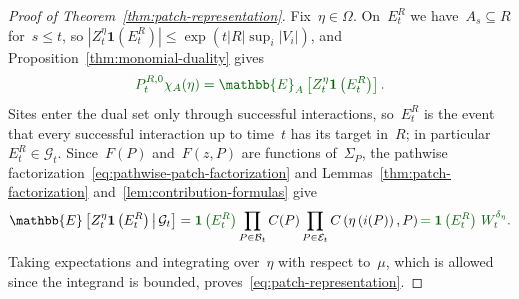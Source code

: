 \documentclass[EJP,preprint,NODS,nobera]{ejpecp}
\newcommand{\E}{\mathbb{E}}
\newcommand{\CE}[2]{\E\Cb{#1\,\middle|\,#2}}
\newcommand{\bb}[1]{\left(#1\right)}
\newcommand{\Cb}[1]{\left[#1\right]}
\newcommand{\abs}[1]{\left|#1\right|}
\newcommand{\ind}{\mathbf{1}}
\newcommand{\chg}[1]{{\color{changegreen}#1}}
\begin{document}
\begin{proof}[Proof of Theorem~\ref{thm:patch-representation}]
\chg{Fix~$\eta\in\Omega$. On~$E_t^R$ we have~$A_s\subseteq R$ for~$s\leq t$, so
$\abs{Z_t^\eta\ind(E_t^R)}\leq\exp\bb{t\abs R\sup_i\abs{V_i}}$, and
Proposition~\ref{thm:monomial-duality} gives}
\begin{equation*}
\chg{P_t^{R,0}\chi_A(\eta)=\E_A\Cb{Z_t^\eta\ind\bb{E_t^R}}.}
\end{equation*}
\chg{Sites enter the dual set only through successful interactions, so~$E_t^R$
is the event that every successful interaction up to time~$t$ has its target
in~$R$; in particular~$E_t^R\in\mathcal G_t$. Since~$F(P)$ and~$F(z,P)$ are
functions of~$\Sigma_P$, the pathwise factorization~\eqref{eq:pathwise-patch-factorization}
and Lemmas~\ref{thm:patch-factorization} and~\ref{lem:contribution-formulas}
give}
\begin{equation*}
\CE{Z_t^\eta\ind\bb{E_t^R}}{\mathcal G_t}
=
\chg{\ind\bb{E_t^R}}
\prod_{P\in\mathcal B_t}C(P)
\prod_{P\in\mathcal E_t}C\bb{\eta\bb{i(P)},P}
\chg{=\ind\bb{E_t^R}\,W_t^{\delta_\eta}.}
\end{equation*}
\chg{Taking expectations and integrating over~$\eta$ with respect to~$\mu$, which
is allowed since the integrand is bounded, proves~\eqref{eq:patch-representation}.}
\end{proof}
\end{document}
